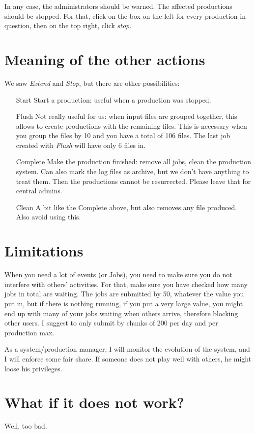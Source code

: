 \documentclass[a4paper,12pt]{article}
\begin{document}
In any case, the administrators should be warned. The affected productions
should be stopped. For that, click on the box on the left for every production
in question, then on the top right, click \emph{stop}.

\section{Meaning of the other actions}
We saw \emph{Extend} and \emph{Stop}, but there are other possibilities:
\begin{itemize}
  \item[Start] Start a production: useful when a production was stopped.
  \item[Flush] Not really useful for us: when input files are grouped together,
  this allows to create productions with the remaining files. This is necessary
  when you group the files by 10 and you have a total of 106 files. The last job
  created with \emph{Flush} will have only 6 files in. 
  \item[Complete] Make the production finished: remove all jobs, clean the
  production system. Can also mark the log files as archive, but we don't have
  anything to treat them. Then the productions cannot be resurrected. Please
  leave that for central admins.
  \item[Clean] A bit like the Complete above, but also removes any file
  produced. Also avoid using this.
\end{itemize}

\section{Limitations}
When you need a lot of events (or Jobs), you need to make sure you do not
interfere with others' activities. For that, make sure you have checked how many
jobs in total are waiting. The jobs are submitted by 50, whatever the value you
put in, but if there is nothing running, if you put a very large value, you
might end up with many of your jobs waiting when others arrive, therefore
blocking other users. I suggest to only submit by chunks of 200 per day and per
production max. 

As a system/production manager, I will monitor the evolution of the system, and
I will enforce some fair share. If someone does not play well with others, he
might loose his privileges.

\section{What if it does not work?}\label{sec:problem}
Well, too bad.
\end{document}
